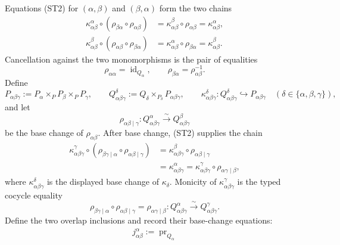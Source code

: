 \begin{definition}
\[  \]
  Equations (ST2) for
  $(\alpha,\beta)$ and $(\beta,\alpha)$ form the two chains
  \[
  \begin{aligned}
    \kappa_{\alpha\beta}^{\alpha}\circ
      (\rho_{\beta\alpha}\circ\rho_{\alpha\beta})
      &=\kappa_{\alpha\beta}^{\beta}\circ\rho_{\alpha\beta}
       =\kappa_{\alpha\beta}^{\alpha},\\
    \kappa_{\alpha\beta}^{\beta}\circ
      (\rho_{\alpha\beta}\circ\rho_{\beta\alpha})
      &=\kappa_{\alpha\beta}^{\alpha}\circ\rho_{\beta\alpha}
       =\kappa_{\alpha\beta}^{\beta}.
  \end{aligned}
  \]
  Cancellation against the two monomorphisms is the pair of equalities
  \[
    \rho_{\alpha\alpha}=\operatorname{id}_{Q_\alpha},
    \qquad
    \rho_{\beta\alpha}=\rho_{\alpha\beta}^{-1}.                  \tag{ST3}
  \]
  Define
  \[
    P_{\alpha\beta\gamma}:=
      P_\alpha\times_PP_\beta\times_PP_\gamma,
    \qquad
    Q_{\alpha\beta\gamma}^{\delta}:=
      Q_\delta\times_{P_\delta}P_{\alpha\beta\gamma},\qquad
    \kappa_{\alpha\beta\gamma}^{\delta}\colon
      Q_{\alpha\beta\gamma}^{\delta}
        \hookrightarrow P_{\alpha\beta\gamma}
      \quad(\delta\in\{\alpha,\beta,\gamma\}),
  \]
  and let
  \[
    \rho_{\alpha\beta\mid\gamma}\colon
      Q_{\alpha\beta\gamma}^{\alpha}\xrightarrow{\sim}
      Q_{\alpha\beta\gamma}^{\beta}
  \]
  be the base change of $\rho_{\alpha\beta}$.  After base change, (ST2)
  supplies the chain
  \[
  \begin{aligned}
    \kappa_{\alpha\beta\gamma}^{\gamma}\circ
      (\rho_{\beta\gamma\mid\alpha}\circ
        \rho_{\alpha\beta\mid\gamma})
      &=\kappa_{\alpha\beta\gamma}^{\beta}\circ
        \rho_{\alpha\beta\mid\gamma}\\
      &=\kappa_{\alpha\beta\gamma}^{\alpha}
       =\kappa_{\alpha\beta\gamma}^{\gamma}\circ
        \rho_{\alpha\gamma\mid\beta},
  \end{aligned}
  \]
  where $\kappa_{\alpha\beta\gamma}^{\delta}$ is the displayed base change
  of $\kappa_\delta$.  Monicity of
  $\kappa_{\alpha\beta\gamma}^{\gamma}$ is the typed cocycle equality
  \[
    \rho_{\beta\gamma\mid\alpha}\circ
      \rho_{\alpha\beta\mid\gamma}
      =\rho_{\alpha\gamma\mid\beta}
      \colon Q_{\alpha\beta\gamma}^{\alpha}\xrightarrow{\sim}
        Q_{\alpha\beta\gamma}^{\gamma}.                          \tag{ST4}
  \]
  Define the two overlap inclusions and record their base-change equations:
  \[
  \begin{gathered}
    j_{\alpha\beta}^{\alpha}:=\operatorname{pr}_{Q_\alpha}

\end{gathered}\]
\end{definition}
